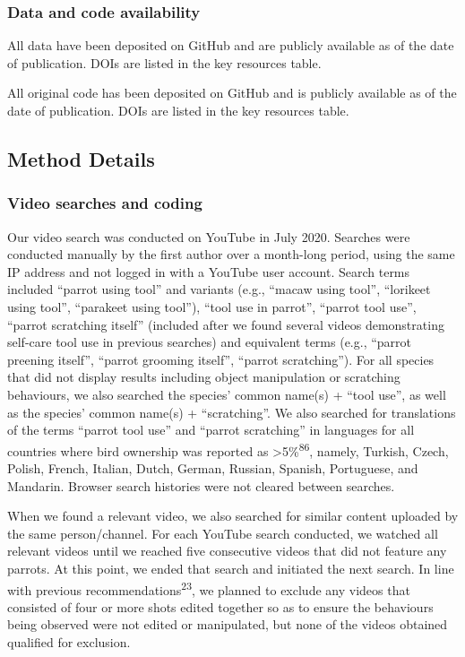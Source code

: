 \documentclass[
  man, donotrepeattitle,floatsintext]{apa6}
\begin{document}
\hypertarget{data-and-code-availability}{%
\subsubsection{Data and code availability}\label{data-and-code-availability}}

All data have been deposited on GitHub and are publicly available as of the date
of publication. DOIs are listed in the key resources table.

All original code has been deposited on GitHub and is publicly available as of
the date of publication. DOIs are listed in the key resources table.

\hypertarget{method-details}{%
\subsection{Method Details}\label{method-details}}

\hypertarget{video-searches-and-coding}{%
\subsubsection{Video searches and coding}\label{video-searches-and-coding}}

Our video search was conducted on YouTube in July 2020. Searches were conducted
manually by the first author over a month-long period, using the same IP address
and not logged in with a YouTube user account. Search terms included
``parrot using tool'' and variants (e.g., ``macaw using tool'', ``lorikeet using
tool'', ``parakeet using tool''), ``tool use in parrot'', ``parrot tool use'', ``parrot
scratching itself'' (included after we found several videos demonstrating
self-care tool use in previous searches) and equivalent terms (e.g., ``parrot
preening itself'', ``parrot grooming itself'', ``parrot scratching''). For all
species that did not display results including object manipulation or scratching
behaviours, we also searched the species' common name(s) + ``tool use'', as well
as the species' common name(s) + ``scratching''. We also searched for translations
of the terms ``parrot tool use'' and ``parrot scratching'' in languages for all
countries where bird ownership was reported as \textgreater5\%\textsuperscript{86}, namely,
Turkish, Czech, Polish, French, Italian, Dutch, German, Russian, Spanish,
Portuguese, and Mandarin. Browser search histories were not cleared between
searches.

When we found a relevant video, we also searched for similar content uploaded by
the same person/channel. For each YouTube search conducted, we watched all
relevant videos until we reached five consecutive videos that did not feature
any parrots. At this point, we ended that search and initiated the next search.
In line with previous recommendations\textsuperscript{23}, we planned to exclude any
videos that consisted of four or more shots edited together so as to ensure the
behaviours being observed were not edited or manipulated, but none of the videos
obtained qualified for exclusion.
\end{document}
